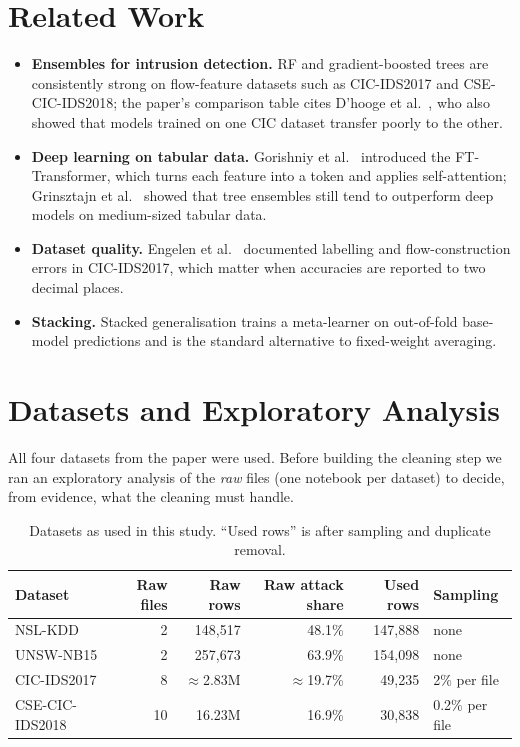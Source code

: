 \documentclass[11pt,a4paper]{article}
\begin{document}
\section{Related Work}
\begin{itemize}
  \item \textbf{Ensembles for intrusion detection.} RF and gradient-boosted trees are consistently strong on
        flow-feature datasets such as CIC-IDS2017 and CSE-CIC-IDS2018; the paper's comparison table cites
        D'hooge et al.\ \cite{dhooge2020}, who also showed that models trained on one CIC dataset transfer poorly to
        the other.
  \item \textbf{Deep learning on tabular data.} Gorishniy et al.\ \cite{gorishniy2021} introduced the
        FT-Transformer, which turns each feature into a token and applies self-attention; Grinsztajn et al.\
        \cite{grinsztajn2022} showed that tree ensembles still tend to outperform deep models on
        medium-sized tabular data.
  \item \textbf{Dataset quality.} Engelen et al.\ \cite{engelen2021} documented labelling and flow-construction
        errors in CIC-IDS2017, which matter when accuracies are reported to two decimal places.
  \item \textbf{Stacking.} Stacked generalisation \cite{wolpert1992} trains a meta-learner on out-of-fold base-model
        predictions and is the standard alternative to fixed-weight averaging.
\end{itemize}

\section{Datasets and Exploratory Analysis}
\label{sec:data}

All four datasets from the paper were used. Before building the cleaning step we ran an exploratory analysis of
the \emph{raw} files (one notebook per dataset) to decide, from evidence, what the cleaning must handle.

\begin{table}[H]
\centering
\caption{Datasets as used in this study. ``Used rows'' is after sampling and duplicate removal.}
\label{tab:datasets}
\small
\begin{tabular}{lrrrrl}
\toprule
Dataset & Raw files & Raw rows & Raw attack share & Used rows & Sampling \\
\midrule
NSL-KDD          & 2  & 148{,}517      & 48.1\% & 147{,}888 & none \\
UNSW-NB15        & 2  & 257{,}673      & 63.9\% & 154{,}098 & none \\
CIC-IDS2017      & 8  & $\approx$2.83M & $\approx$19.7\% & 49{,}235  & 2\% per file \\
CSE-CIC-IDS2018  & 10 & 16.23M         & 16.9\% & 30{,}838  & 0.2\% per file \\
\bottomrule
\end{tabular}
\end{table}
\end{document}
